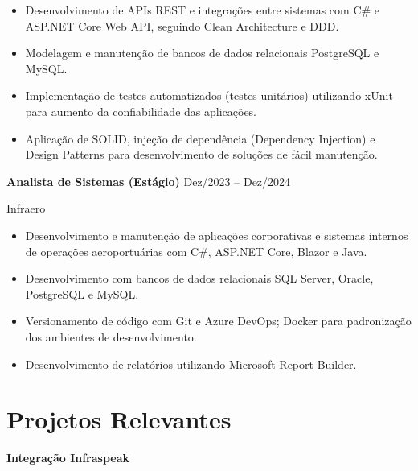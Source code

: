 \documentclass[11pt,a4paper]{article}
\begin{document}
\begin{itemize}[leftmargin=*,noitemsep,topsep=2pt]

\item Desenvolvimento de APIs REST e integrações entre sistemas com C\# e ASP.NET Core Web API, seguindo Clean Architecture e DDD.

\item Modelagem e manutenção de bancos de dados relacionais PostgreSQL e MySQL.

\item Implementação de testes automatizados (testes unitários) utilizando xUnit para aumento da confiabilidade das aplicações.

\item Aplicação de SOLID, injeção de dependência (Dependency Injection) e Design Patterns para desenvolvimento de soluções de fácil manutenção.

\end{itemize}

\vspace{0.2cm}

\textbf{Analista de Sistemas (Estágio)}
\hfill Dez/2023 -- Dez/2024

Infraero

\begin{itemize}[leftmargin=*,noitemsep,topsep=2pt]

\item Desenvolvimento e manutenção de aplicações corporativas e sistemas internos de operações aeroportuárias com C\#, ASP.NET Core, Blazor e Java.

\item Desenvolvimento com bancos de dados relacionais SQL Server, Oracle, PostgreSQL e MySQL.

\item Versionamento de código com Git e Azure DevOps; Docker para padronização dos ambientes de desenvolvimento.

\item Desenvolvimento de relatórios utilizando Microsoft Report Builder.

\end{itemize}

\section{Projetos Relevantes}

\textbf{Integração Infraspeak}
\end{document}
